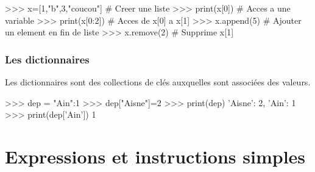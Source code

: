 \documentclass[11pt,oneside]{article}
\begin{document}
\begin{exemple}

\begin{minipage}[c]{.45\linewidth}
\begin{py}
\begin{python}
>>> x=[1,"b",3,"coucou"] # Creer une liste
>>> print(x[0]) # Acces a une variable
>>> print(x[0:2]) # Acces de x[0] a x[1]
>>> x.append(5) # Ajouter un element en fin de liste
>>> x.remove(2) # Supprime x[1]
\end{python}
\end{py}
\end{minipage}\hfill
\begin{minipage}[c]{.45\linewidth}
\end{minipage}
\end{exemple}

\subsubsection{Les dictionnaires}
\begin{defi}
Les dictionnaires sont des collections de clés auxquelles sont associées des valeurs. 
\end{defi}

\begin{exemple}
\begin{minipage}[c]{.45\linewidth}
\begin{py}
\begin{python}
>>> dep = {"Ain":1}
>>> dep["Aisne"]=2
>>> print(dep)
	{'Aisne': 2, 'Ain': 1}
>>> print(dep['Ain'])
	1
\end{python}
\end{py}
\end{minipage}\hfill
\begin{minipage}[c]{.45\linewidth}
\end{minipage}
\end{exemple}





\section{Expressions et instructions simples}


\end{document}
